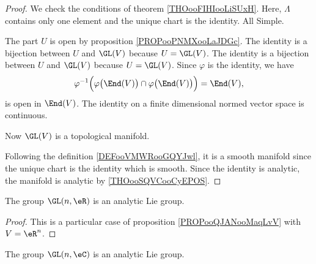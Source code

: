 \begin{proof}
	We check the conditions of theorem \ref{THOooFIHIooLiSUxH}. Here, \( \Lambda\) contains only one element and the unique chart is the identity. All Simple.

	\begin{subproof}
		The part \( U\) is open by proposition \ref{PROPooPNMXooLaJDGc}.
		The identity is a bijection between \( U\) and \( \GL(V)\) because \( U=\GL(V)\).
		The identity is a bijection between \( U\) and \( \GL(V)\) because \( U=\GL(V)\).
		Since \( \varphi\) is the identity, we have
		\begin{equation}
			\varphi^{-1}\Big(   \varphi\big( \End(V) \big)\cap\varphi\big( \End(V) \big)   \Big)=\End(V),
		\end{equation}
		is open in \( \End(V)\).
		The identity on a finite dimensional normed vector space is continuous.
	\end{subproof}
	Now \( \GL(V)\) is a topological manifold.

	Following the definition \ref{DEFooVMWRooGQYJwl}, it is a smooth manifold since the unique chart is the identity which is smooth. Since the identity is analytic, the manifold is analytic by \ref{THOooSQVCooCyEPOS}.
\end{proof}


\begin{proposition}		\label{PROPooPZABooXxQkFi}
	The group \( \GL(n,\eR)\) is an analytic Lie group.
\end{proposition}

\begin{proof}
	This is a particular case of proposition \ref{PROPooQJANooMaqLvV} with \( V=\eR^n\).
\end{proof}

\begin{proposition}     \label{PROPooWRVKooLfqLfV}
	The group \( \GL(n,\eC)\) is an analytic Lie group.
\end{proposition}

